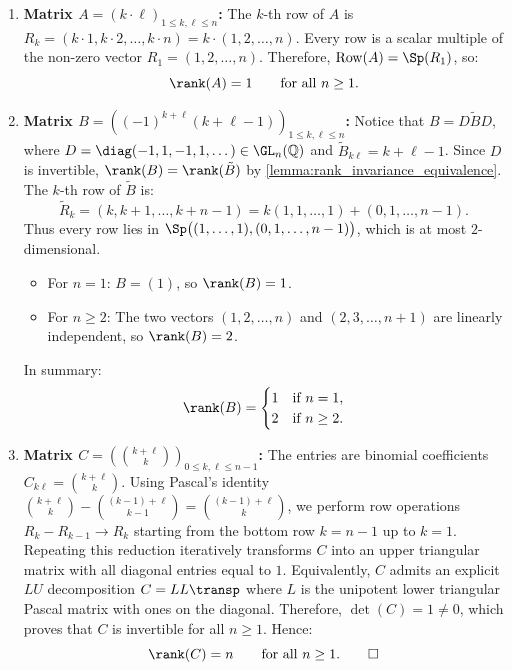 \begin{exercisesolution*}
\label{sol:ranks_parametric_families_rational_matrices}
\begin{enumerate}[label=\textbf{(\alph*)}]
    \item \textbf{Matrix $A = (k \cdot \ell)_{1 \le k, \ell \le n}$:}
    The $k$-th row of $A$ is $R_k = (k \cdot 1, k \cdot 2, \dots, k \cdot n) = k \cdot (1, 2, \dots, n)$.
    Every row is a scalar multiple of the non-zero vector $R_1 = (1, 2, \dots, n)$.
    Therefore, $\operatorname{Row}(A) = \Sp(R_1)$, so:
    \[
    \rank(A) = 1 \qquad \text{for all } n \ge 1.
    \]

    \item \textbf{Matrix $B = \left((-1)^{k+\ell}(k + \ell - 1)\right)_{1 \le k, \ell \le n}$:}
    Notice that $B = D \tilde{B} D$, where $D = \diag(-1, 1, -1, 1, \dots) \in \GL_n(\mathbb{Q})$ and $\tilde{B}_{k\ell} = k + \ell - 1$.
    Since $D$ is invertible, $\rank(B) = \rank(\tilde{B})$ by \cref{lemma:rank_invariance_equivalence}.
    The $k$-th row of $\tilde{B}$ is:
    \[
    \tilde{R}_k = (k, k+1, \dots, k+n-1) = k (1, 1, \dots, 1) + (0, 1, \dots, n-1).
    \]
    Thus every row lies in $\Sp\big((1, \dots, 1), (0, 1, \dots, n-1)\big)$, which is at most $2$-dimensional.
    \begin{itemize}
        \item For $n = 1$: $B = (1)$, so $\rank(B) = 1$.
        \item For $n \ge 2$: The two vectors $(1, 2, \dots, n)$ and $(2, 3, \dots, n+1)$ are linearly independent, so $\rank(B) = 2$.
    \end{itemize}
    In summary:
    \[
    \rank(B) = \begin{cases} 1 & \text{if } n = 1, \\ 2 & \text{if } n \ge 2. \end{cases}
    \]

    \item \textbf{Matrix $C = \left(\binom{k+\ell}{k}\right)_{0 \le k, \ell \le n-1}$:}
    The entries are binomial coefficients $C_{k\ell} = \binom{k+\ell}{k}$.
    Using Pascal's identity $\binom{k+\ell}{k} - \binom{(k-1)+\ell}{k-1} = \binom{(k-1)+\ell}{k}$, we perform row operations $R_k - R_{k-1} \to R_k$ starting from the bottom row $k = n-1$ up to $k = 1$.
    Repeating this reduction iteratively transforms $C$ into an upper triangular matrix with all diagonal entries equal to $1$.
    Equivalently, $C$ admits an explicit $L U$ decomposition $C = L L\transp$ where $L$ is the unipotent lower triangular Pascal matrix with ones on the diagonal.
    Therefore, $\det(C) = 1 \ne 0$, which proves that $C$ is invertible for all $n \ge 1$.
    Hence:
    \[
    \rank(C) = n \qquad \text{for all } n \ge 1. \qedhere
    \]
\end{enumerate}
\end{exercisesolution*}
